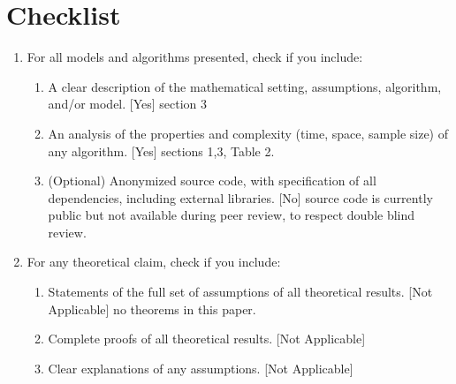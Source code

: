 \documentclass[twoside]{article}
\begin{document}




\section*{Checklist}


\begin{enumerate}

  \item For all models and algorithms presented, check if you include:
  \begin{enumerate}
    \item A clear description of the mathematical setting, assumptions, algorithm, and/or model. [Yes] section 3
    \item An analysis of the properties and complexity (time, space, sample size) of any algorithm. [Yes] sections 1,3, Table 2.
    \item (Optional) Anonymized source code, with specification of all dependencies, including external libraries. [No] source code is currently public but not available during peer review, to respect double blind review.
  \end{enumerate}

  \item For any theoretical claim, check if you include:
  \begin{enumerate}
    \item Statements of the full set of assumptions of all theoretical results. [Not Applicable] no theorems in this paper.
    \item Complete proofs of all theoretical results. [Not Applicable]
    \item Clear explanations of any assumptions. [Not Applicable]
  \end{enumerate}


\end{enumerate}
\end{document}
